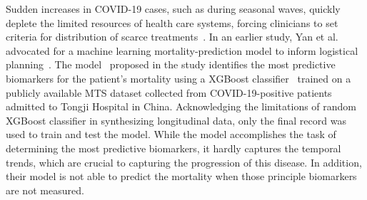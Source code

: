 Sudden increases in COVID-19 cases, such as during seasonal waves, quickly deplete the limited resources of health care systems, forcing clinicians to set criteria for distribution of scarce treatments~\cite{centersstrategies}. In an earlier study, Yan et al. advocated for a machine learning mortality-prediction model to inform logistical planning~\cite{yan2020interpretable}. The model~\cite{yan2020interpretable} proposed in the study identifies the most predictive biomarkers for the patient's mortality using a XGBoost classifier~\cite{chen2016xgboost} trained on a publicly available MTS dataset collected from COVID-19-positive patients admitted to Tongji Hospital in China. Acknowledging the limitations of random XGBoost classifier in synthesizing longitudinal data, only the final record was used to train and test the model. While the model accomplishes the task of determining the most predictive biomarkers, it hardly captures the temporal trends, which are crucial to capturing the progression of this disease. In addition, their model is not able to predict the mortality when those principle biomarkers are not measured.


